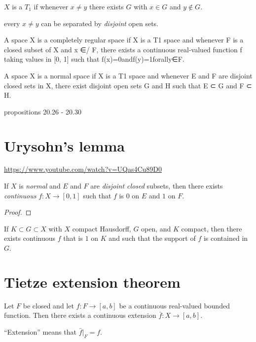 \begin{definition*}

  $X$ is a $T_1$  if whenever $x \neq y$ there exists $G$ with $x \in G$ and $y \notin G$.

   every $x \neq y$ can be separated by {\it disjoint} open sets.

   A space X is a completely regular space if X is a T1 space and whenever F is a closed subset of X and x ∈/ F, there exists a continuous real-valued function f taking values in [0, 1] such that f(x)=0andf(y)=1forally∈F.

   A space X is a normal space if X is a T1 space and whenever E and F are disjoint closed sets in X, there exist disjoint open sets G and H such that E ⊂ G and F ⊂ H.

\end{definition*}

 propositions 20.26 - 20.30


\section{Urysohn's lemma}

\url{https://www.youtube.com/watch?v=UQas4Cu89D0}

\begin{theorem}
  If $X$ is {\it normal} and $E$ and $F$ are {\it disjoint closed} subsets, then there exists {\it continuous}
  $f: X \to [0, 1]$ such that $f$ is $0$ on $E$ and $1$ on $F$.
\end{theorem}

\begin{proof}
\end{proof}

\begin{corollary}
  If $K \subset G \subset X$ with $X$ compact Hausdorff, $G$ open, and $K$ compact, then there exists
  continuous $f$ that is $1$ on $K$ and such that the support of $f$ is contained in $G$.
\end{corollary}

\section{Tietze extension theorem}

\begin{theorem}
  Let $F$ be closed and let $f: F \to [a, b]$ be a continuous real-valued bounded function. Then there exists a
  continuous extension $\bar f: X \to [a, b]$.

  ``Extension​'' means that $\bar f|_F = f$.
\end{theorem}

